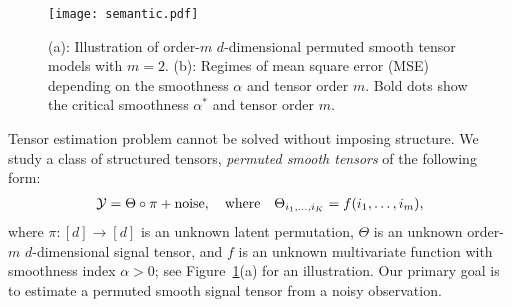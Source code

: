 \documentclass{article}
\theoremstyle{definition}
\begin{document}

\begin{figure}[h]
    \centering
    \texttt{[image: semantic.pdf]}
    \caption{(a): Illustration of order-$m$ $d$-dimensional permuted smooth tensor models with $m=2$. (b): Regimes of mean square error (MSE) depending on the smoothness $\alpha$ and  tensor order $m$. Bold dots show the critical smoothness $\alpha^*$ and tensor order $m$. }
    \label{fig:rate}
   \vspace{-.5cm}
\end{figure}

Tensor estimation problem cannot be solved without imposing structure. 
We study a class of structured tensors, \emph{permuted smooth tensors} of the following form:
\begin{align}\label{eq:gmd}
    \mathcal{Y} = \Theta\circ \pi + \text{noise}, \quad \text{where}\quad \Theta_{i_1,\ldots,i_K}=f(i_1,\ldots,i_m),
\end{align}
where $\pi\colon[d]\rightarrow[d]$ is an unknown latent permutation, $\Theta$ is an unknown order-$m$ $d$-dimensional signal tensor, and $f$ is an unknown multivariate function with smoothness index $\alpha>0$; see Figure~\ref{fig:rate}(a) for an illustration. Our primary goal is to estimate a permuted smooth signal tensor from a noisy observation. 
\end{document}
